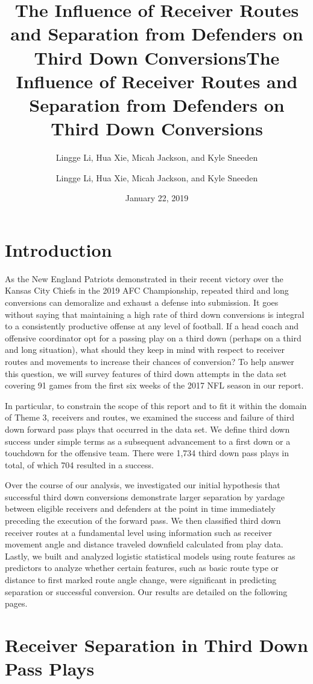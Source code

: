 \documentclass[12pt,letterpaper]{article}
\title{The Influence of Receiver Routes and Separation from Defenders on Third Down Conversions}
\author{Lingge Li, Hua Xie, Micah Jackson, and Kyle Sneeden}
\title{The Influence of Receiver Routes and Separation from Defenders on Third Down Conversions}
\author{Lingge Li, Hua Xie, Micah Jackson, and Kyle Sneeden}
\date{January 22, 2019}
\begin{document}
\maketitle

\section*{Introduction}

As the New England Patriots demonstrated in their recent victory over the Kansas City Chiefs in the 2019 AFC Championship, repeated third and long conversions can demoralize and exhaust a defense into submission. It goes without saying that maintaining a high rate of third down conversions is integral to a consistently productive offense at any level of football. If a head coach and offensive coordinator opt for a passing play on a third down (perhaps on a third and long situation), what should they keep in mind with respect to receiver routes and movements to increase their chances of conversion? To help answer this question, we will survey features of third down attempts in the data set covering 91 games from the first six weeks of the 2017 NFL season in our report.

In particular, to constrain the scope of this report and to fit it within the domain of Theme 3, receivers and routes, we examined the success and failure of third down forward pass plays that occurred in the data set. We define third down success under simple terms as a subsequent advancement to a first down or a touchdown for the offensive team. There were 1,734 third down pass plays in total, of which 704 resulted in a success. 

Over the course of our analysis, we investigated our initial hypothesis that successful third down conversions demonstrate larger separation by yardage between eligible receivers and defenders at the point in time immediately preceding the execution of the forward pass. We then classified third down receiver routes at a fundamental level using information such as receiver movement angle and distance traveled downfield calculated from play data. Lastly, we built and analyzed logistic statistical models using route features as predictors to analyze whether certain features, such as basic route type or distance to first marked route angle change, were significant in predicting separation or successful conversion. Our results are detailed on the following pages.

\section*{Receiver Separation in Third Down Pass Plays}
\end{document}
